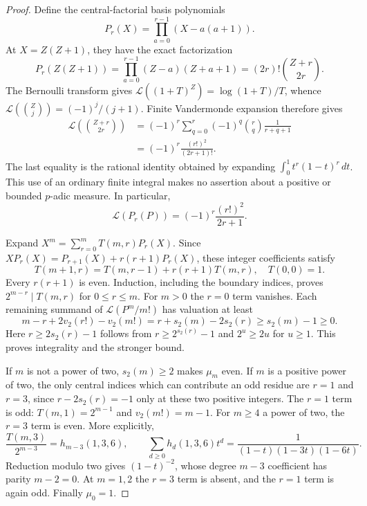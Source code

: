 \begin{proof}
Define the central-factorial basis polynomials
\[
 P_r(X)=\prod_{a=0}^{r-1}(X-a(a+1)).
\]
At $X=Z(Z+1)$, they have the exact factorization
\begin{equation}
 P_r(Z(Z+1))
   =\prod_{a=0}^{r-1}(Z-a)(Z+a+1)
   =(2r)!\binom{Z+r}{2r}.
 \label{eq:central-factorial-substitution}
\end{equation}
The Bernoulli transform gives
$\mathcal L((1+T)^Z)=\log(1+T)/T$, whence
$\mathcal L(\binom Zj)=(-1)^j/(j+1)$. Finite Vandermonde expansion
therefore gives
\begin{align}
 \mathcal L\left(\binom{Z+r}{2r}\right)
 &=(-1)^r\sum_{q=0}^r(-1)^q\binom rq\frac1{r+q+1}\nonumber\\
 &=(-1)^r\frac{(r!)^2}{(2r+1)!}.
 \label{eq:central-factorial-evaluation}
\end{align}
The last equality is the rational identity obtained by expanding
$\int_0^1t^r(1-t)^r\,dt$. This use of an ordinary finite integral makes
no assertion about a positive or bounded $p$-adic measure. In
particular,
\[
 \mathcal L(P_r(P))=(-1)^r\frac{(r!)^2}{2r+1}.
\]

Expand $X^m=\sum_{r=0}^mT(m,r)P_r(X)$. Since
$XP_r(X)=P_{r+1}(X)+r(r+1)P_r(X)$, these integer coefficients satisfy
\begin{equation}
 T(m+1,r)=T(m,r-1)+r(r+1)T(m,r),
 \quad T(0,0)=1.
 \label{eq:central-factorial-recurrence}
\end{equation}
Every $r(r+1)$ is even. Induction, including the boundary indices,
proves $2^{m-r}\mid T(m,r)$ for $0\leq r\leq m$.
For $m>0$ the $r=0$ term vanishes. Each remaining summand of
$\mathcal L(P^m/m!)$ has valuation at least
\begin{equation}
 m-r+2v_2(r!)-v_2(m!)
   =r+s_2(m)-2s_2(r)\geq s_2(m)-1\geq0.
 \label{eq:central-factorial-term-bound}
\end{equation}
Here $r\geq2s_2(r)-1$ follows from
$r\geq2^{s_2(r)}-1$ and $2^u\geq2u$ for $u\geq1$.
This proves integrality and the stronger bound.

If $m$ is not a power of two, $s_2(m)\geq2$ makes $\mu_m$ even.
If $m$ is a positive power of two, the only central indices which can
contribute an odd residue are $r=1$ and $r=3$, since
$r-2s_2(r)=-1$ only at these two positive integers. The $r=1$ term is
odd: $T(m,1)=2^{m-1}$ and $v_2(m!)=m-1$. For $m\geq4$ a power of
two, the $r=3$ term is even. More explicitly,
\[
 \frac{T(m,3)}{2^{m-3}}=h_{m-3}(1,3,6),
 \qquad
 \sum_{d\geq0}h_d(1,3,6)t^d
       =\frac1{(1-t)(1-3t)(1-6t)}.
\]
Reduction modulo two gives $(1-t)^{-2}$, whose degree $m-3$
coefficient has parity $m-2=0$. At $m=1,2$ the $r=3$ term is absent,
and the $r=1$ term is again odd. Finally $\mu_0=1$.
\end{proof}


